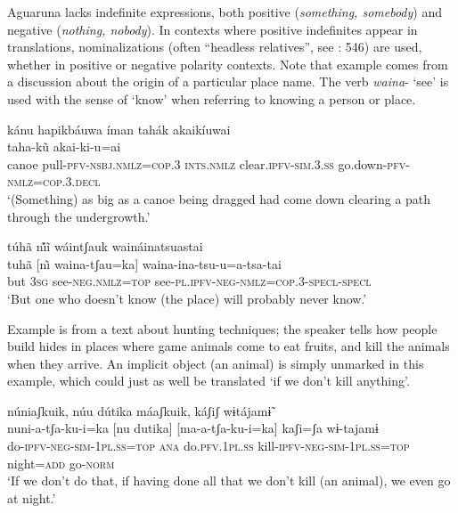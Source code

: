 \documentclass[output=paper,colorlinks,citecolor=brown,draft]{langscibook}
\begin{document}
Aguaruna lacks indefinite expressions, both positive (\textit{something, somebody}) and negative (\textit{nothing, nobody}). In contexts where positive indefinites appear in translations, nominalizations (often “headless relatives”, see \citealt{Overall2017a}: 546) are used, whether in positive  or negative  polarity contexts. Note that example  comes from a discussion about the origin of a particular place name. The verb \textit{waina}{}- ‘see’ is used with the sense of ‘know’ when referring to knowing a person or place.

\ea\label{ex:agu:47}
    \glll kánu hapikbáuwa íman tahák akaikíuwai \\ 
          [kanu  hapi-ki-mau=a  iman] taha-k\~u  akai-ki-u=ai \\
          canoe  pull-\textsc{pfv-nsbj.nmlz=cop.3}  \textsc{ints.nmlz} clear.\textsc{ipfv-sim.3.ss}  go.down\textsc{{}-pfv-nmlz=cop.3.decl}\\
    \glt ‘(Something) as big as a canoe being dragged had come down clearing a path through the undergrowth.’ \citep[551]{Overall2017a}
\z 

\ea\label{ex:agu:48}
    \glll túhã nı̃́ĩ wáintʃauk waináinatsuastai \\ 
          tuhã  [n\~\i{}  waina-tʃau=ka]  waina-ina-tsu-u=a-tsa-tai \\
          but  \textsc{3sg}  see-\textsc{neg.nmlz=top}  see-\textsc{pl.ipfv-neg-nmlz=cop.3-specl-specl} \\
    \glt ‘But one who doesn’t know (the place) will probably never know.’ \citep[378]{Overall2017a}
\z 

Example  is from a text about hunting techniques; the speaker tells how people build hides in places where game animals come to eat fruits, and kill the animals when they arrive. An implicit object (an animal) is simply unmarked in this example, which could just as well be translated ‘if we don’t kill anything'.

\ea\label{ex:agu:49}
    \glll núniaʃkuik, núu dútika máaʃkuik, káʃiʃ wɨtájamɨ̃ \\ 
          nuni-a-tʃa-ku-i=ka  [nu  dutika] [ma-a-tʃa-ku-i=ka]  kaʃi=ʃa  wɨ-tajamɨ \\
          do\textsc{{}-ipfv-neg-sim-1pl.ss=top}  \textsc{ana} do.\textsc{pfv.1pl.ss} kill\textsc{{}-ipfv-neg-sim-1pl.ss=top}  night=\textsc{add}  go-\textsc{norm} \\
    \glt ‘If we don’t do that, if having done all that we don’t kill (an animal), we even go at night.’ \citep[619]{Overall2017a}
\z 
\end{document}
